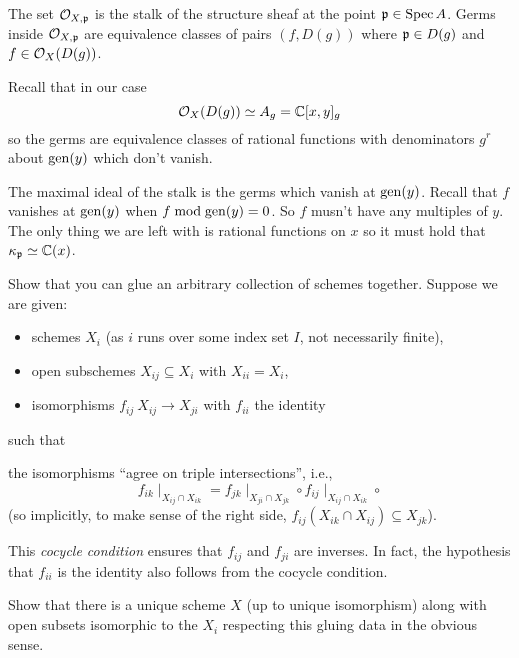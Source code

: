 \documentclass[12pt]{memoir}
\begin{document}
    \begin{ptcbr}
    The set $\mathcal{O}_{X,\mathfrak{p}}$ is the stalk of the structure sheaf at the point $\mathfrak{p}\in \operatorname{Spec} A$. Germs inside $\mathcal{O}_{X,\mathfrak{p}}$ are equivalence classes of pairs $(f,D(g))$ where $\mathfrak{p}\in D(g)$ and $f\in\mathcal{O}_X(D(g))$.\par 
    Recall that in our case 
    $$\mathcal{O}_X(D(g))\simeq A_g=\mathbb{C}[x,y]_g$$
    so the germs are equivalence classes of rational functions with denominators $g^r$ about $\operatorname{gen}(y)$ which don't vanish.\par 
    The maximal ideal of the stalk is the germs which vanish at $\operatorname{gen}(y)$. Recall that $f$ vanishes at $\operatorname{gen}(y)$ when $f\bmod\operatorname{gen}(y)=0$. So $f$ musn't have any multiples of $y$. The only thing we are left with is rational functions on $x$ so it must hold that $\kappa_{\mathfrak{p}}\simeq \mathbb{C}(x)$.
    \end{ptcbr}

    \begin{Ej}[4.4.A Vakil]
        Show that you can glue an arbitrary collection of schemes together. Suppose we are given:
        \begin{itemize}
            \itemsep=-0.4em
            \item  schemes $X_i$ (as $i$ runs over some index set $I$, not necessarily finite),
            \item open subschemes $X_{ij}\subseteq X_i$ with $X_{ii}=X_i$,
            \item isomorphisms $f_{ij}\:X_{ij}\to X_{ji}$ with $f_{ii}$ the identity
        \end{itemize}
        such that 
        \begin{significant}
            the isomorphisms “agree on triple intersections”,
            i.e.,
            $$f_{ik}\mid_{X_{ij}\cap X_{ik}}= f_{jk}\mid_{X_{ji}\cap X_{jk}}\circ f_{ij}\mid_{X_{ij}\cap X_{ik}}\circ$$
            (so implicitly, to make sense of
            the right side, $f_{ij}(X_{ik}\cap X_{ij})\subseteq X_{jk}$).            
        \end{significant}
        This \emph{cocycle condition} ensures that $f_{ij}$ and $f_{ji}$ are inverses. In fact, the hypothesis that $f_{ii}$ is the identity also follows from the cocycle condition.\par 
        Show that there is a unique scheme $X$ (up to unique isomorphism) along with open subsets isomorphic to the $X_i$ respecting this gluing data in the obvious sense.
    \end{Ej}
    \iffalse
    \begin{ptcbr}
    
    \end{ptcbr}
        \fi
\end{document}
